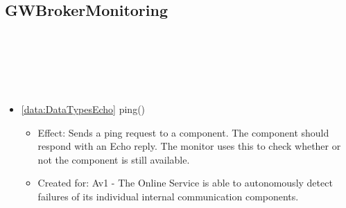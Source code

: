   \subsection{GWBrokerMonitoring}\label{int:GWBrokerMonitoring}
    \begin{description}
      \item[Provided by:] \iconcomponent{}~
      \item[Required by:] \iconcomponent{}~
      \item[Operations:] ~
    \begin{itemize}[noitemsep,nolistsep,leftmargin=-.25cm]
      \item \textsf{\ref{data:DataTypesEcho} ping()}
        \begin{itemize}[noitemsep,nolistsep]
           \item Effect: Sends a ping request to a component. The component should respond with an Echo reply. The monitor uses this to check whether or not the component is still available.
\item Created for: Av1 - The Online Service is able to autonomously detect failures of its individual internal communication components.
        \end{itemize}
    \end{itemize}
    \end{description}


